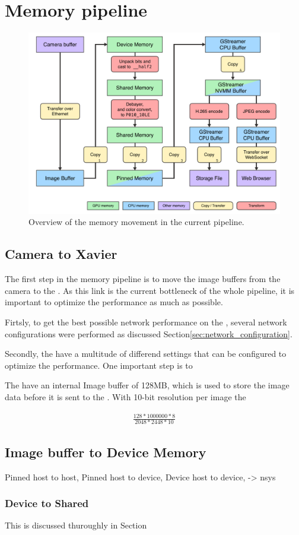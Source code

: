 \section{Memory pipeline}

\begin{figure}[H]
    \centering
    \includegraphics[width=\textwidth]{figures/memory_pipeline/current.pdf}
    \caption{Overview of the memory movement in the current pipeline.}
    \label{fig:pipeline_current}
\end{figure}



\subsection{Camera to Xavier}
The first step in the memory pipeline is to move the image buffers from the camera to the \jx.
As this link is the current bottleneck of the whole pipeline, it is important to optimize the performance as much as possible.

Firtsly, to get the best possible network performance on the \jx, several network configurations were performed as discussed Section\ref{sec:network_configuration}.

Secondly, the \cams have a multitude of differend settings that can be configured to optimize the performance.
One important step is to

The \cams have an internal Image buffer of 128MB, which is used to store the image data before it is sent to the \jx.
With 10-bit resolution per image the


\begin{align}
    \frac{128*1000000*8}{2048*2448*10}
\end{align}

\subsection{Image buffer to Device Memory}
Pinned host to host,
Pinned host to device,
Device host to device, -> nsys

\subsubsection{Device to Shared}
This is discussed thuroughly in Section




